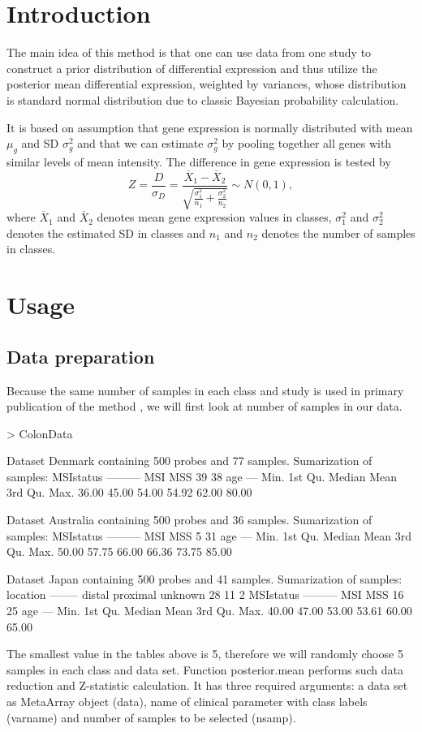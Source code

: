 \documentclass[a4paper]{report}
\begin{document}
\section*{Introduction}
The main idea of this method is that one can use data from one study to construct a prior distribution of differential expression and thus utilize the posterior mean differential expression, weighted by variances, whose distribution is standard normal distribution due to classic Bayesian probability calculation. \par
It is based on assumption that gene expression is normally distributed with mean $\mu_g $ and SD $\sigma^2_g$ and that we can estimate $\sigma^2_g$ by pooling together all genes with similar levels of mean intensity. The difference in gene expression is tested by
\[ Z=\frac{D}{\sigma_D}=\frac{\overline{X}_1 - \overline{X}_2}{\sqrt{\frac{\sigma_1^2}{n_1}+\frac{\sigma_2^2}{n_2}}} \sim N(0,1),\]
where $\overline{X}_1$ and $\overline{X}_2$ denotes mean gene expression values in classes, $\sigma_1^2$ and $\sigma_2^2$ denotes the estimated SD in classes and $n_1$ and $n_2$ denotes the number of samples in classes. 
\section*{Usage}
\subsection*{Data preparation}
Because the same number of samples in each class and study is used in primary publication of the method \cite{Wang}, we will first look at number of samples in our data.
\begin{Schunk}
\begin{Sinput}
> ColonData
\end{Sinput}
\begin{Soutput}
Dataset Denmark  containing 500 probes and  77 samples. 
Sumarization of samples: 
MSIstatus 
--------- 
MSI MSS 
 39  38 
age 
--- 
   Min. 1st Qu.  Median    Mean 3rd Qu.    Max. 
  36.00   45.00   54.00   54.92   62.00   80.00 

Dataset Australia  containing 500 probes and  36 samples. 
Sumarization of samples: 
MSIstatus 
--------- 
MSI MSS 
  5  31 
age 
--- 
   Min. 1st Qu.  Median    Mean 3rd Qu.    Max. 
  50.00   57.75   66.00   66.36   73.75   85.00 

Dataset Japan  containing 500 probes and  41 samples. 
Sumarization of samples: 
location 
-------- 
  distal proximal  unknown 
      28       11        2 
MSIstatus 
--------- 
MSI MSS 
 16  25 
age 
--- 
   Min. 1st Qu.  Median    Mean 3rd Qu.    Max. 
  40.00   47.00   53.00   53.61   60.00   65.00 
\end{Soutput}
\end{Schunk}
The smallest value in the tables above is 5, therefore we will randomly choose 5 samples in each class and data set. Function {\ttfamily posterior.mean} performs such data reduction and Z-statistic calculation. It has three required arguments: a data set as MetaArray object ({\ttfamily data}), name of clinical parameter with class labels ({\ttfamily  varname}) and number of samples to be selected ({\ttfamily nsamp}). 
\end{document}
